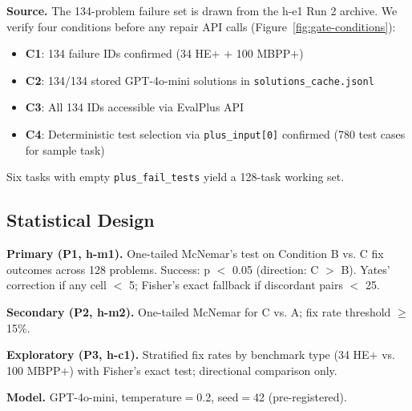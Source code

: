 \textbf{Source.} The 134-problem failure set is drawn from the h-e1 Run 2 archive.
We verify four conditions before any repair API calls (Figure~\ref{fig:gate-conditions}):

\begin{itemize}
\item \textbf{C1}: 134 failure IDs confirmed (34 HE$+$ $+$ 100 MBPP$+$)
\item \textbf{C2}: 134/134 stored GPT-4o-mini solutions in \texttt{solutions\_cache.jsonl}
\item \textbf{C3}: All 134 IDs accessible via EvalPlus API
\item \textbf{C4}: Deterministic test selection via \texttt{plus\_input[0]} confirmed (780 test cases for sample task)
\end{itemize}

Six tasks with empty \texttt{plus\_fail\_tests} yield a 128-task working set.

\subsection{Statistical Design}

\textbf{Primary (P1, h-m1).} One-tailed McNemar's test on Condition B vs. C fix outcomes
across 128 problems. Success: p $<$ 0.05 (direction: C $>$ B). Yates' correction if any
cell $<$ 5; Fisher's exact fallback if discordant pairs $<$ 25.

\textbf{Secondary (P2, h-m2).} One-tailed McNemar for C vs. A; fix rate threshold $\geq$ 15\%.

\textbf{Exploratory (P3, h-c1).} Stratified fix rates by benchmark type (34 HE$+$ vs. 100
MBPP$+$) with Fisher's exact test; directional comparison only.

\textbf{Model.} GPT-4o-mini, temperature$=$0.2, seed$=$42 (pre-registered).
